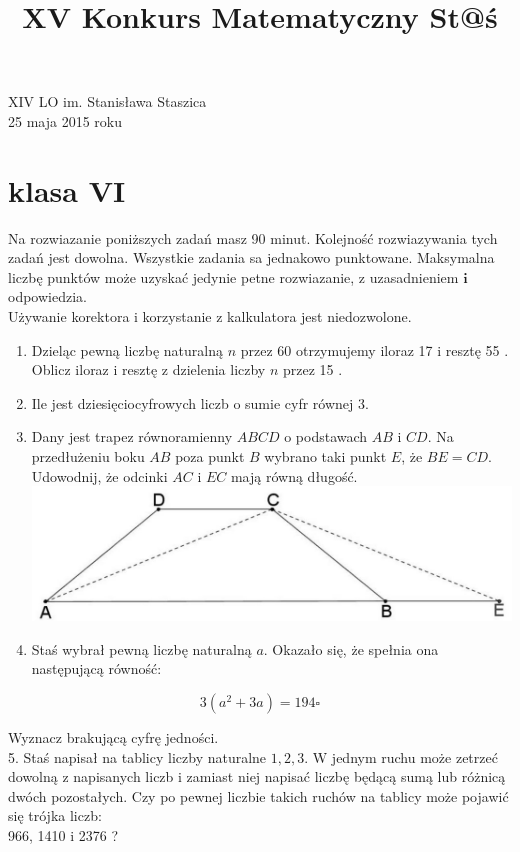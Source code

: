 \documentclass[10pt]{article}
\title{XV Konkurs Matematyczny St@ś }
\author{}
\date{}
\begin{document}
\maketitle
XIV LO im. Stanisława Staszica\\
25 maja 2015 roku

\section*{klasa VI}
Na rozwiazanie poniższych zadań masz 90 minut. Kolejność rozwiazywania tych zadań jest dowolna. Wszystkie zadania sa jednakowo punktowane. Maksymalna liczbę punktów może uzyskać jedynie petne rozwiazanie, z uzasadnieniem \(\boldsymbol{i}\) odpowiedzia.\\
Używanie korektora i korzystanie z kalkulatora jest niedozwolone.

\begin{enumerate}
  \item Dzieląc pewną liczbę naturalną \(n\) przez 60 otrzymujemy iloraz 17 i resztę 55 . Oblicz iloraz i resztę z dzielenia liczby \(n\) przez 15 .
  \item Ile jest dziesięciocyfrowych liczb o sumie cyfr równej 3.
  \item Dany jest trapez równoramienny \(A B C D\) o podstawach \(A B\) i \(C D\). Na przedłużeniu boku \(A B\) poza punkt \(B\) wybrano taki punkt \(E\), że \(B E=C D\). Udowodnij, że odcinki \(A C\) i \(E C\) mają równą długość.\\
\includegraphics[max width=\textwidth, center]{2024_11_21_dbc9ac1df4a08138bbc0g-1}
  \item Staś wybrał pewną liczbę naturalną \(a\). Okazało się, że spełnia ona następującą równość:
\end{enumerate}

\[
3\left(a^{2}+3 a\right)=194 \square
\]

Wyznacz brakującą cyfrę jedności.\\
5. Staś napisał na tablicy liczby naturalne \(1,2,3\). W jednym ruchu może zetrzeć dowolną z napisanych liczb i zamiast niej napisać liczbę będącą sumą lub różnicą dwóch pozostałych. Czy po pewnej liczbie takich ruchów na tablicy może pojawić się trójka liczb:\\
966, 1410 i 2376 ?
\end{document}

